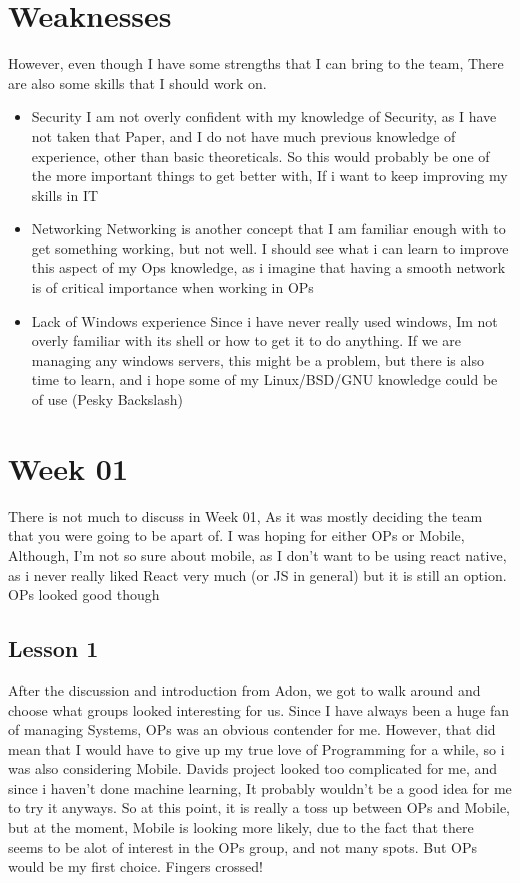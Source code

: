\documentclass{article}
\begin{document}
\section*{Weaknesses}
However, even though I have some strengths that I can bring to the team, There are also some skills that I should work on.
\begin{itemize}
\item Security\newline
	I am not overly confident with my knowledge of Security, as I have not taken that Paper, and I do not have much previous knowledge of experience, other than basic theoreticals. So this would probably be one of the more important things to get better with, If i want to keep improving my skills in IT
\item Networking\newline
	Networking is another concept that I am familiar enough with to get something working, but not well. I should see what i can learn to improve this aspect of my Ops knowledge, as i imagine that having a smooth network is of critical importance when working in OPs

\item Lack of Windows experience\newline
	Since i have never really used windows, Im not overly familiar with its shell or how to get it to do anything. If we are managing any windows servers, this might be a problem, but there is also time to learn, and i hope some of my Linux/BSD/GNU knowledge could be of use (Pesky Backslash)

\end{itemize}

\section{Week 01}
There is not much to discuss in Week 01, As it was mostly deciding the team that you were going to be apart of. I was hoping for either OPs or Mobile, Although, I'm not so sure about mobile, as I don't want to be using react native, as i never really liked React very much (or JS in general) but it is still an option. OPs looked good though 
\subsection{Lesson 1}
	After the discussion and introduction from Adon, we got to walk around and choose what groups looked interesting for us. Since I have always been a huge fan of managing Systems, OPs was an obvious contender for me. However, that did mean that I would have to give up my true love of Programming for a while, so i was also considering Mobile. Davids project looked too complicated for me, and since i haven't done machine learning, It probably wouldn't be a good idea for me to try it anyways. So at this point, it is really a toss up between OPs and Mobile, but at the moment, Mobile is looking more likely, due to the fact that there seems to be alot of interest in the OPs group, and not many spots. But OPs would be my first choice. Fingers crossed!
\end{document}
